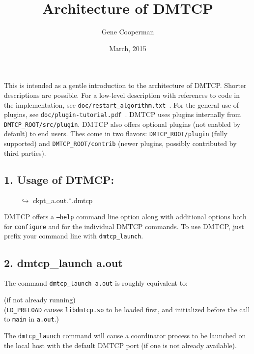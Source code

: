 \documentclass{article}
\title{Architecture of DMTCP}
\author{Gene Cooperman}
\date{March, 2015}
\begin{document}
\maketitle

This is intended as a gentle introduction to the architecture of DMTCP.
Shorter descriptions are possible.  For a low-level description with
references to code in the implementation, see
{\tt doc/restart\_algorithm.txt}~.  For the general use of plugins,
see {\tt doc/plugin-tutorial.pdf}~.  DMTCP uses plugins internally
from {\tt DMTCP\_ROOT/src/plugin}.  DMTCP also offers optional plugins
(not enabled by default) to end users.  Thes come in two flavors:
{\tt DMTCP\_ROOT/plugin}
(fully supported) and {\tt DMTCP\_ROOT/contrib} (newer plugins,
possibly contributed by third parties).

\subsection*{1. Usage of DTMCP:}
\begin{algorithmic}[1]
 \newline
\hbox{\ \ \ \ } $\hookrightarrow$ ckpt\_a.out.*.dmtcp
\end{algorithmic}

\bigskip
\noindent
DMTCP offers a {\tt --help} command line option along with additional options
both for {\tt configure} and for the individual DMTCP commands.
To use DMTCP, just prefix your command line with {\tt dmtcp\_launch}.

\subsection*{2. dmtcp\_launch a.out}

The command {\tt dmtcp\_launch a.out} is roughly equivalent to:

\begin{algorithmic}[1]
  (if not already running)
 \\ ({\tt LD\_PRELOAD} causes
   {\tt libdmtcp.so} to be loaded first, and initialized before the call to
   {\tt main} in {\tt a.out}.)
\end{algorithmic}

The {\tt dmtcp\_launch} command will cause a coordinator process
to be launched on the local host with the default DMTCP port (if one is
not already available).
\end{document}

